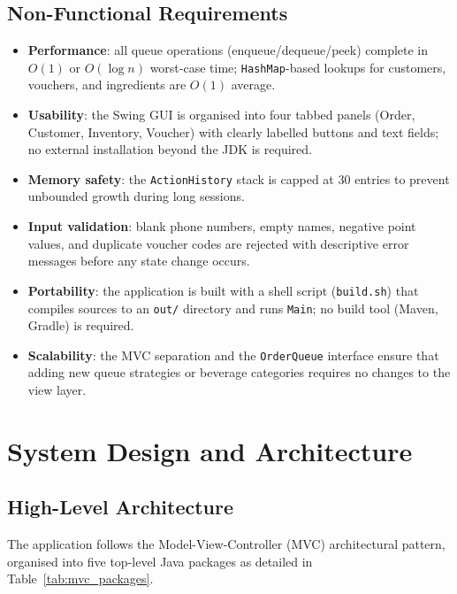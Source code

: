 \documentclass[11pt,a4paper]{article}
\begin{document}
\subsection{Non-Functional Requirements}
\begin{itemize}[leftmargin=*]
    \item \textbf{Performance}: all queue operations (enqueue/dequeue/peek) complete in $O(1)$ or $O(\log n)$ worst-case time; \texttt{HashMap}-based lookups for customers, vouchers, and ingredients are $O(1)$ average.
    \item \textbf{Usability}: the Swing GUI is organised into four tabbed panels (Order, Customer, Inventory, Voucher) with clearly labelled buttons and text fields; no external installation beyond the JDK is required.
    \item \textbf{Memory safety}: the \texttt{ActionHistory} stack is capped at 30 entries to prevent unbounded growth during long sessions.
    \item \textbf{Input validation}: blank phone numbers, empty names, negative point values, and duplicate voucher codes are rejected with descriptive error messages before any state change occurs.
    \item \textbf{Portability}: the application is built with a shell script (\texttt{build.sh}) that compiles sources to an \texttt{out/} directory and runs \texttt{Main}; no build tool (Maven, Gradle) is required.
    \item \textbf{Scalability}: the MVC separation and the \texttt{OrderQueue} interface ensure that adding new queue strategies or beverage categories requires no changes to the view layer.
\end{itemize}

\newpage

\section{System Design and Architecture}

\subsection{High-Level Architecture}
The application follows the Model-View-Controller (MVC) architectural pattern, organised into five top-level Java packages as detailed in Table~\ref{tab:mvc_packages}.
\end{document}
